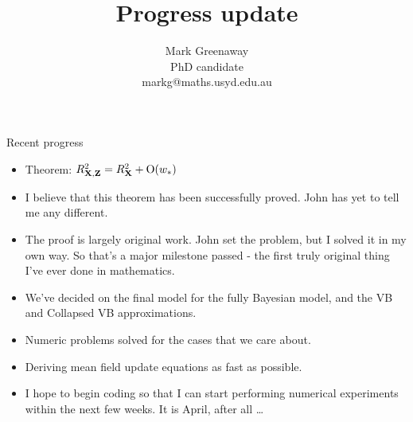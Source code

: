 \documentclass{beamer}
\title{Progress update}
\author{Mark Greenaway\\PhD candidate\\markg@maths.usyd.edu.au}
\begin{document}
\begin{frame}
\titlepage
\end{frame}


\begin{frame}{Recent progress}
\begin{itemize}
\def \O { \text{O} }
\item Theorem: $R^2_{\mX, \mZ} = R^2_\mX + \O(w_*)$
\item I believe that this theorem has been successfully proved. John has yet to tell me any different.
\item The proof is largely original work. John set the problem, but I solved it in my own way. So that's a
			major milestone passed - the first truly original thing I've ever done in mathematics.
\item We've decided on the final model for the fully Bayesian model, and the VB and Collapsed VB
			approximations.
\item Numeric problems solved for the cases that we care about.
\item Deriving mean field update equations as fast as possible.
\item I hope to begin coding so that I can start performing numerical experiments within the next few
			weeks. It is April, after all \ldots
\end{itemize}
\end{frame}
\end{document}
